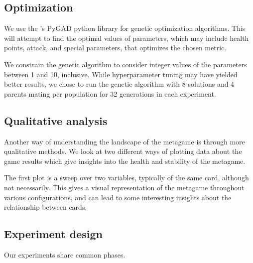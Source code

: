 \subsection{Optimization}

We use the \citeauthor{gad2021pygad}'s  PyGAD python library for genetic optimization algorithms. This will attempt to find the optimal values of
parameters, which may include health points, attack, and special parameters, that optimizes
the chosen metric.

We constrain the genetic algorithm to consider integer values of the parameters between 1 and 10, inclusive. While hyperparameter tuning may have yielded better results,
we chose to run the genetic algorithm with 8 solutions and 4 parents mating per population for 32 generations in each experiment.

\subsection{Qualitative analysis}

Another way of understanding the landscape of the metagame is through more qualitative methods. We look at two different ways of plotting data about the game results which give insights into the health and stability of the metagame. 

The first plot is a sweep over two variables, typically of the same card, although not necessarily. This gives a visual representation of the metagame throughout various configurations, and can lead to some interesting insights about the relationship between cards. 

\subsection{Experiment design}


Our experiments share common phases.

